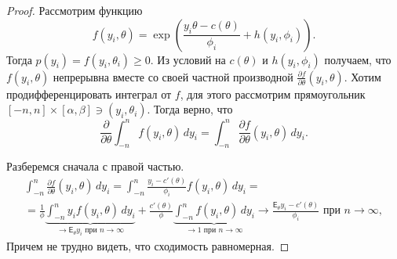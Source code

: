 \begin{proof}
  Рассмотрим функцию
  $$
  f(y_i, \theta) = \exp\left(
  \frac{y_i\theta - c(\theta)}{\phi_i} + h(y_i, \phi_i)\right).
  $$
  Тогда $p(y_i) = f(y_i, \theta_i) \geq 0$. Из условий на $c(\theta)$ и $h(y_i, \phi_i)$ получаем, что $f(y_i, \theta)$ непрерывна вместе со своей частной производной $\frac{\partial f}{\partial \theta}(y_i, \theta)$. Хотим продифференцировать интеграл от $f$, для этого рассмотрим прямоугольник $[-n, n]\times[\alpha, \beta] \ni (y_i, \theta_i)$. Тогда верно, что
  $$
  \frac{\partial}{\partial\theta} \int_{-n}^n f(y_i, \theta)\,dy_i = \int_{-n}^n\frac{\partial f}{\partial\theta}(y_i,\theta)\,dy_i.
  $$
  
  Разберемся сначала с правой частью.
  \begin{multline*}
    \int_{-n}^n\frac{\partial f}{\partial\theta}(y_i,\theta)\,dy_i =
    \int_{-n}^n\frac{y_i - c'(\theta)}{\phi_i} f(y_i, \theta)\,dy_i =\\=
    \frac{1}{\phi}
    \underbrace{
      \int_{-n}^n y_if(y_i, \theta)\,dy_i
    }_{\to\mathsf{E}_\theta y_i \text{ при } n\to\infty} +
    \frac{c'(\theta)}{\phi}
    \underbrace{
      \int_{-n}^n f(y_i, \theta)\,dy_i
    }_{\to 1 \text{ при } n\to\infty}\to
    \frac{\mathsf{E}_\theta y_i - c'(\theta)}{\phi_i} \text{ при } n\to\infty,
  \end{multline*}
  Причем не трудно видеть, что сходимость равномерная.
  

\end{proof}
